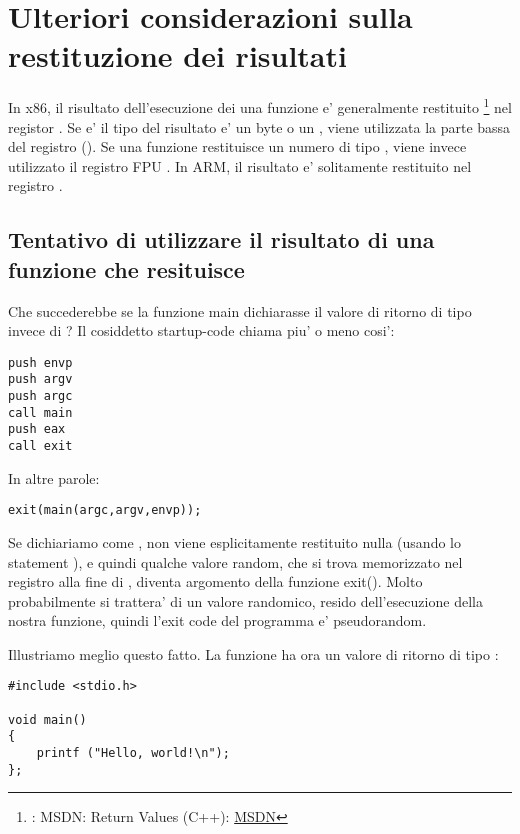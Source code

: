 \section{Ulteriori considerazioni sulla restituzione dei risultati}


In x86, il risultato dell'esecuzione dei una funzione e' generalmente restituito
\footnote{\Seealso: MSDN: Return Values (C++): \href{http://go.yurichev.com/17258}{MSDN}}
nel registor \EAX. 
Se e' il tipo del risultato e' un byte o un \Tchar, viene utilizzata la parte bassa del registro \EAX (\AL). 
Se una funzione restituisce un numero di tipo \Tfloat, viene invece utilizzato il registro FPU .
In ARM, il risultato e' solitamente restituito nel registro .

\subsection{Tentativo di utilizzare il risultato di una funzione che resituisce \Tvoid}

Che succederebbe se la funzione main dichiarasse il valore di ritorno di tipo \Tvoid invece di \Tint?
Il cosiddetto startup-code chiama \main piu' o meno cosi':

\begin{lstlisting}[style=customasmx86]
push envp
push argv
push argc
call main
push eax
call exit
\end{lstlisting}

In altre parole:

\begin{lstlisting}[style=customc]
exit(main(argc,argv,envp));
\end{lstlisting}

Se dichiariamo \main come \Tvoid, non viene esplicitamente restituito nulla  (usando lo statement ),
e quindi qualche valore random, che si trova memorizzato nel registro \EAX alla fine di \main, diventa argomento della funzione exit().
Molto probabilmente si trattera' di un valore randomico, resido dell'esecuzione della nostra funzione, quindi l'exit code del programma 
e' pseudorandom.
\par
Illustriamo meglio questo fatto. 
La funzione \main ha ora un valore di ritorno di tipo \Tvoid:

\begin{lstlisting}[style=customc]
#include <stdio.h>

void main()
{
	printf ("Hello, world!\n");
};
\end{lstlisting}

